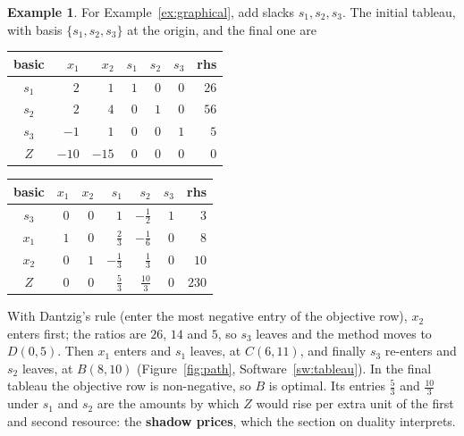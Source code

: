 \documentclass[11pt,a4paper]{article}
\numberwithin{equation}{section}
\theoremstyle{definition}
\newtheorem{exa}[thm]{Example}
\begin{document}
\begin{exa}
\label{ex:tableau}
For Example~\ref{ex:graphical}, add slacks $s_1, s_2, s_3$. The initial tableau, with basis $\{s_1, s_2, s_3\}$ at the origin, and the final one are
\begin{center}
\small
\begin{tabular}{c|rrrrr|r}
basic & $x_1$ & $x_2$ & $s_1$ & $s_2$ & $s_3$ & rhs \\
\hline
$s_1$ & $2$ & $1$ & $1$ & $0$ & $0$ & $26$ \\
$s_2$ & $2$ & $4$ & $0$ & $1$ & $0$ & $56$ \\
$s_3$ & $-1$ & $1$ & $0$ & $0$ & $1$ & $5$ \\
\hline
$Z$ & $-10$ & $-15$ & $0$ & $0$ & $0$ & $0$
\end{tabular}
\qquad
\begin{tabular}{c|rrrrr|r}
basic & $x_1$ & $x_2$ & $s_1$ & $s_2$ & $s_3$ & rhs \\
\hline
$s_3$ & $0$ & $0$ & $1$ & $-\frac12$ & $1$ & $3$ \\
$x_1$ & $1$ & $0$ & $\frac23$ & $-\frac16$ & $0$ & $8$ \\
$x_2$ & $0$ & $1$ & $-\frac13$ & $\frac13$ & $0$ & $10$ \\
\hline
$Z$ & $0$ & $0$ & $\frac53$ & $\frac{10}3$ & $0$ & $230$
\end{tabular}
\end{center}
With Dantzig's rule (enter the most negative entry of the objective row), $x_2$ enters first; the ratios are $26$, $14$ and $5$, so $s_3$ leaves and the method moves to $D(0, 5)$. Then $x_1$ enters and $s_1$ leaves, at $C(6, 11)$, and finally $s_3$ re-enters and $s_2$ leaves, at $B(8, 10)$ (Figure~\ref{fig:path},
Software~\ref{sw:tableau}). In the final tableau the objective row is non-negative, so $B$ is optimal. Its entries $\frac53$ and $\frac{10}3$ under $s_1$ and $s_2$ are the amounts by which $Z$ would rise per extra unit of the first and second resource: the \textbf{shadow prices}, which the section on duality interprets.
\end{exa}
\end{document}
